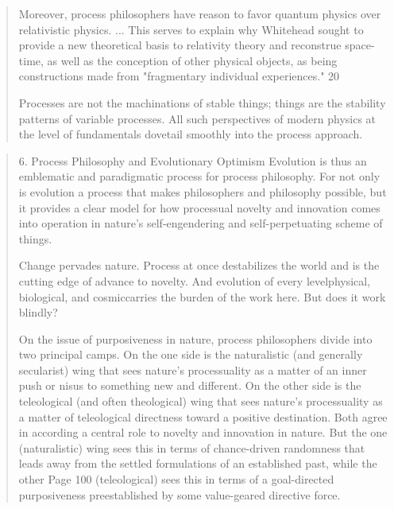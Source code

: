 \documentclass[a4paper]{Thesis}
\begin{document}
	\begin{quotation}
		Moreover, process philosophers have reason to favor quantum physics over relativistic
		physics.
		...
		This serves to explain
		why Whitehead sought to provide a new theoretical basis to relativity theory and
		reconstrue space-time, as well as the conception of other physical objects, as being
		constructions made from "fragmentary individual experiences." 20
		
		Processes are not the
		machinations of stable things; things are the stability patterns of variable processes. All
		such perspectives of modern physics at the level of fundamentals dovetail smoothly into
		the process approach.
	\end{quotation}
	
	\begin{quotation}
		6. Process Philosophy and Evolutionary Optimism
		Evolution is thus an emblematic and paradigmatic process for process philosophy. For not
		only is evolution a process that makes philosophers and philosophy possible, but it
		provides a clear model for how processual novelty and innovation comes into operation in
		nature's self-engendering and self-perpetuating scheme of things.
		
		Change pervades
		nature. Process at once destabilizes the world and is the cutting edge of advance to
		novelty. And evolution of every levelphysical, biological, and cosmiccarries the burden of
		the work here. But does it work blindly?
		
		On the issue of purposiveness in nature, process philosophers divide into two principal
		camps. On the one side is the naturalistic (and generally secularist) wing that sees
		nature's processuality as a matter of an inner push or nisus to something new and
		different. On the other side is the teleological (and often theological) wing that sees
		nature's processuality as a matter of teleological directness toward a positive destination.
		Both agree in according a central role to novelty and innovation in nature. But the one
		(naturalistic) wing sees this in terms of chance-driven randomness that leads away from
		the settled formulations of an established past, while the other
		Page 100
		(teleological) sees this in terms of a goal-directed purposiveness preestablished by some
		value-geared directive force.
		

\end{quotation}
\end{document}
